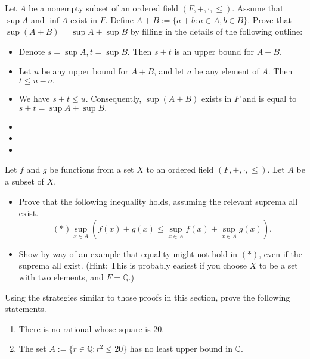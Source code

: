 \documentclass[12pt,letterpaper,boxed]{hmcpset}
\begin{document}
\begin{problem}[Exercise 2.4]
Let $A$ be a nonempty subset of an ordered field $(F,+,\cdot,\leq)$. Assume that $\sup A$ and $\inf A$ exist in $F.$ Define $A + B := \{ a + b : a \in A, b \in B \}.$ Prove that $\sup(A + B) = \sup A + \sup B$ by filling in the details of the following outline: 
\vspace{-2mm}
\begin{itemize}
	\itemsep0em
	\item Denote $s = \sup A, t = \sup B.$ Then $s + t$ is an upper bound for $A + B.$
	\item Let $u$ be any upper bound for $A + B$, and let $a$ be any element of $A$. Then $t \leq u - a.$
	\item We have $s+t \leq u.$ Consequently, $\sup(A + B)$ exists in $F$ and is equal to $s + t = \sup A + \sup B.$ 
\end{itemize}
\end{problem}

\begin{solution}
\begin{itemize}
	\itemsep0em
	\item 
	\item
	\item
\end{itemize}
\end{solution}

\begin{problem}[Exercise 2.5.]
Let $f$ and $g$ be functions from a set $X$ to an ordered field $(F,+,\cdot,\leq).$ Let $A$ be a subset of $X.$
\begin{itemize}
	\itemsep0em
	\item Prove that the following inequality holds, assuming the relevant suprema all exist. $$(*) \sup_{x \in A}(f(x) + g(x) \leq \sup_{x \in A}f(x) + \sup_{x\in A}g(x)).$$
	\item Show by way of an example that equality might not hold in $(*)$, even if the suprema all exist. (Hint: This is probably easiest if you choose $X$ to be a set with two elements, and $F=\mathbb{Q}$.)
\end{itemize}

\end{problem}

\begin{solution}
\end{solution}

\begin{problem}[Exercise 3.3.]
Using the strategies similar to those proofs in this section, prove the following statements.
\vspace{-2mm}
\begin{enumerate}
	\itemsep0em
	\item There is no rational whose square is 20.
	\item The set $A := \{r \in \mathbb{Q} : r^2 \le 20\}$ has no least upper bound in $\mathbb{Q}$. 
\end{enumerate}
\end{problem}
\end{document}
